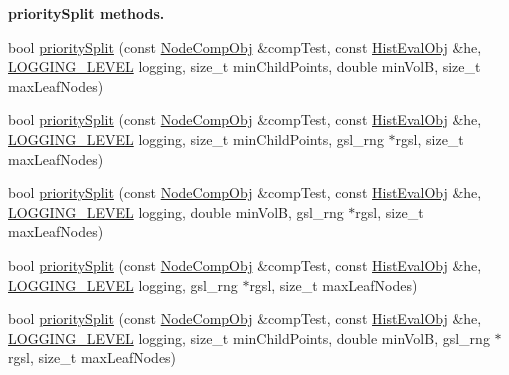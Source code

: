 \begin{Indent}{\bf priority\-Split methods.}
\begin{DoxyCompactItemize}
\item 
bool \hyperlink{classsubpavings_1_1AdaptiveHistogram_ab28cddbe199adccec104b223f8848712}{priority\-Split} (const \hyperlink{classsubpavings_1_1NodeCompObj}{\-Node\-Comp\-Obj} \&comp\-Test, const \hyperlink{classsubpavings_1_1HistEvalObj}{\-Hist\-Eval\-Obj} \&he, \hyperlink{namespacesubpavings_aef8e51096b59ecaf1a1e9b2ee24b6089}{\-L\-O\-G\-G\-I\-N\-G\-\_\-\-L\-E\-V\-E\-L} logging, size\-\_\-t min\-Child\-Points, double min\-Vol\-B, size\-\_\-t max\-Leaf\-Nodes)
\item 
bool \hyperlink{classsubpavings_1_1AdaptiveHistogram_aea0d424449b7d93babef81d49bbbdb70}{priority\-Split} (const \hyperlink{classsubpavings_1_1NodeCompObj}{\-Node\-Comp\-Obj} \&comp\-Test, const \hyperlink{classsubpavings_1_1HistEvalObj}{\-Hist\-Eval\-Obj} \&he, \hyperlink{namespacesubpavings_aef8e51096b59ecaf1a1e9b2ee24b6089}{\-L\-O\-G\-G\-I\-N\-G\-\_\-\-L\-E\-V\-E\-L} logging, size\-\_\-t min\-Child\-Points, gsl\-\_\-rng $\ast$rgsl, size\-\_\-t max\-Leaf\-Nodes)
\item 
bool \hyperlink{classsubpavings_1_1AdaptiveHistogram_ad6a946d5c729b0f49d78962680d5d659}{priority\-Split} (const \hyperlink{classsubpavings_1_1NodeCompObj}{\-Node\-Comp\-Obj} \&comp\-Test, const \hyperlink{classsubpavings_1_1HistEvalObj}{\-Hist\-Eval\-Obj} \&he, \hyperlink{namespacesubpavings_aef8e51096b59ecaf1a1e9b2ee24b6089}{\-L\-O\-G\-G\-I\-N\-G\-\_\-\-L\-E\-V\-E\-L} logging, double min\-Vol\-B, gsl\-\_\-rng $\ast$rgsl, size\-\_\-t max\-Leaf\-Nodes)
\item 
bool \hyperlink{classsubpavings_1_1AdaptiveHistogram_a630b400683794cd527173b18eb126f84}{priority\-Split} (const \hyperlink{classsubpavings_1_1NodeCompObj}{\-Node\-Comp\-Obj} \&comp\-Test, const \hyperlink{classsubpavings_1_1HistEvalObj}{\-Hist\-Eval\-Obj} \&he, \hyperlink{namespacesubpavings_aef8e51096b59ecaf1a1e9b2ee24b6089}{\-L\-O\-G\-G\-I\-N\-G\-\_\-\-L\-E\-V\-E\-L} logging, gsl\-\_\-rng $\ast$rgsl, size\-\_\-t max\-Leaf\-Nodes)
\item 
bool \hyperlink{classsubpavings_1_1AdaptiveHistogram_a2154185722cd1d4f61f65c7d84d77f2b}{priority\-Split} (const \hyperlink{classsubpavings_1_1NodeCompObj}{\-Node\-Comp\-Obj} \&comp\-Test, const \hyperlink{classsubpavings_1_1HistEvalObj}{\-Hist\-Eval\-Obj} \&he, \hyperlink{namespacesubpavings_aef8e51096b59ecaf1a1e9b2ee24b6089}{\-L\-O\-G\-G\-I\-N\-G\-\_\-\-L\-E\-V\-E\-L} logging, size\-\_\-t min\-Child\-Points, double min\-Vol\-B, gsl\-\_\-rng $\ast$rgsl, size\-\_\-t max\-Leaf\-Nodes)
\end{DoxyCompactItemize}
\end{Indent}
